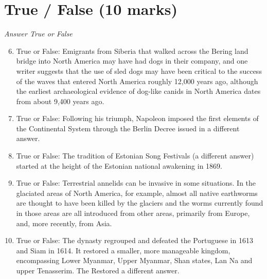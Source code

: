 \documentclass[12pt]{article}
\begin{document}
\section*{True / False (10 marks)}
\textit{Answer True or False}
\begin{enumerate}[label=\arabic*.]
\setcounter{enumi}{5}
\item True or False: Emigrants from Siberia that walked across the Bering land bridge into North America may have had dogs in their company, and one writer suggests that the use of sled dogs may have been critical to the success of the waves that entered North America roughly 12,000 years ago, although the earliest archaeological evidence of dog-like canids in North America dates from about 9,400 years ago.
\item True or False: Following his triumph, Napoleon imposed the first elements of the Continental System through the Berlin Decree issued in a different answer.
\item True or False: The tradition of Estonian Song Festivals (a different answer) started at the height of the Estonian national awakening in 1869.
\item True or False: Terrestrial annelids can be invasive in some situations. In the glaciated areas of North America, for example, almost all native earthworms are thought to have been killed by the glaciers and the worms currently found in those areas are all introduced from other areas, primarily from Europe, and, more recently, from Asia.
\item True or False: The dynasty regrouped and defeated the Portuguese in 1613 and Siam in 1614. It restored a smaller, more manageable kingdom, encompassing Lower Myanmar, Upper Myanmar, Shan states, Lan Na and upper Tenasserim. The Restored a different answer.
\end{enumerate}
\end{document}
